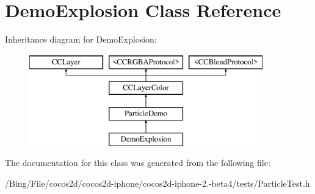 \hypertarget{interface_demo_explosion}{\section{Demo\-Explosion Class Reference}
\label{interface_demo_explosion}
}
Inheritance diagram for Demo\-Explosion\-:\begin{figure}[H]
\begin{center}
\leavevmode
\includegraphics[height=4.000000cm]{interface_demo_explosion}
\end{center}
\end{figure}


The documentation for this class was generated from the following file\-:\begin{DoxyCompactItemize}
\item 
/\-Bing/\-File/cocos2d/cocos2d-\/iphone/cocos2d-\/iphone-\/2.-\/beta4/tests/Particle\-Test.\-h\end{DoxyCompactItemize}
